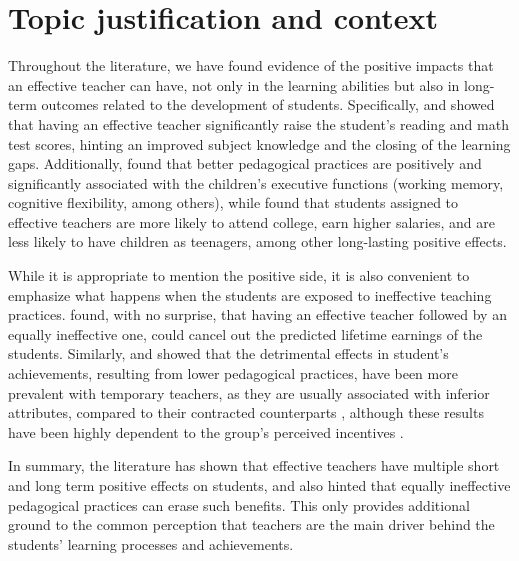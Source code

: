 \section{Topic justification and context}

Throughout the literature, we have found evidence of the positive impacts that an effective teacher can have, not only in the learning abilities but also in long-term outcomes related to the development of students. Specifically, \citet{Rockoff_2004, Rivkin_et_al_2005, Duflo_et_al_2009, Hanushek_et_al_2012, Muralidharan_et_al_2013, Chetty_et_al_2014a} and \citet{Araujo_et_al_2016} showed that having an effective teacher significantly raise the student's reading and math test scores, hinting an improved subject knowledge and the closing of the learning gaps. Additionally, \citet{Araujo_et_al_2016} found that better pedagogical practices are positively and significantly associated with the children's executive functions (working memory, cognitive flexibility, among others), while \citet{Chetty_et_al_2014b} found that students assigned to effective teachers are more likely to attend college, earn higher salaries, and are less likely to have children as teenagers, among other long-lasting positive effects.

While it is appropriate to mention the positive side, it is also convenient to emphasize what happens when the students are exposed to ineffective teaching practices. \citet{Hanushek_et_al_2012} found, with no surprise, that having an effective teacher followed by an equally ineffective one, could cancel out the predicted lifetime earnings of the students. Similarly, \citet{Ayala_2017} and \citet{Marotta_2019} showed that the detrimental effects in student's achievements, resulting from lower pedagogical practices, have been more prevalent with temporary teachers, as they are usually associated with inferior attributes, compared to their contracted counterparts \citep{Bertoni_et_al_2020a}, although these results have been highly dependent to the group's perceived incentives \citep{Duflo_et_al_2009, Muralidharan_et_al_2013, Duflo_et_al_2015}.

In summary, the literature has shown that effective teachers have multiple short and long term positive effects on students, and also hinted that equally ineffective pedagogical practices can erase such benefits. This only provides additional ground to the common perception that teachers are the main driver behind the students' learning processes and achievements.

